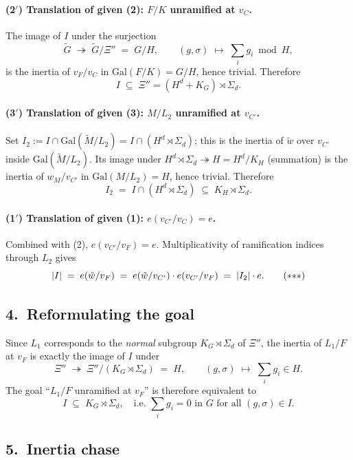\paragraph{(2$'$) Translation of given (2): $F/K$ unramified at $v_C$.} The image of $I$ under the surjection
\[
\tilde G \;\twoheadrightarrow\; \tilde G/\Xi'' \;=\; G/H, \qquad (g,\sigma)\;\mapsto\;\sum_i g_i \bmod H,
\]
is the inertia of $v_F/v_C$ in $\mathrm{Gal}(F/K) = G/H$, hence trivial. Therefore
\[
\boxed{\,I \;\subseteq\; \Xi'' = (H^d + K_G) \rtimes \Sigma_d.\,} \tag{$\ast$}
\]

\paragraph{(3$'$) Translation of given (3): $M/L_2$ unramified at $v_{C'}$.} Set $I_2 := I \cap \mathrm{Gal}(\tilde M/L_2) = I \cap (H^d \rtimes \Sigma_d)$; this is the inertia of $\tilde w$ over $v_{C'}$ inside $\mathrm{Gal}(\tilde M/L_2)$. Its image under $H^d \rtimes \Sigma_d \twoheadrightarrow H = H^d/K_H$ (summation) is the inertia of $w_M/v_{C'}$ in $\mathrm{Gal}(M/L_2) = H$, hence trivial. Therefore
\[
\boxed{\,I_2 \;=\; I \cap (H^d \rtimes \Sigma_d) \;\subseteq\; K_H \rtimes \Sigma_d.\,} \tag{$\ast\ast$}
\]

\paragraph{(1$'$) Translation of given (1): $e(v_{C'}/v_C) = e$.} Combined with (2), $e(v_{C'}/v_F) = e$. Multiplicativity of ramification indices through $L_2$ gives
\[
|I| \;=\; e(\tilde w/v_F) \;=\; e(\tilde w/v_{C'}) \cdot e(v_{C'}/v_F) \;=\; |I_2| \cdot e. \tag{$\ast{\ast}\ast$}
\]

\subsection*{4.\ Reformulating the goal}

Since $L_1$ corresponds to the \emph{normal} subgroup $K_G \rtimes \Sigma_d$ of $\Xi''$, the inertia of $L_1/F$ at $v_F$ is exactly the image of $I$ under
\[
\Xi'' \;\twoheadrightarrow\; \Xi''/(K_G \rtimes \Sigma_d) \;=\; H, \qquad (g,\sigma)\;\mapsto\;\sum_i g_i \in H.
\]
The goal ``$L_1/F$ unramified at $v_F$'' is therefore equivalent to
\[
\boxed{\,I \;\subseteq\; K_G \rtimes \Sigma_d, \quad\text{i.e.\ }\sum_i g_i = 0\text{ in }G\text{ for all }(g,\sigma)\in I.\,}\tag{Goal}
\]

\subsection*{5.\ Inertia chase}

